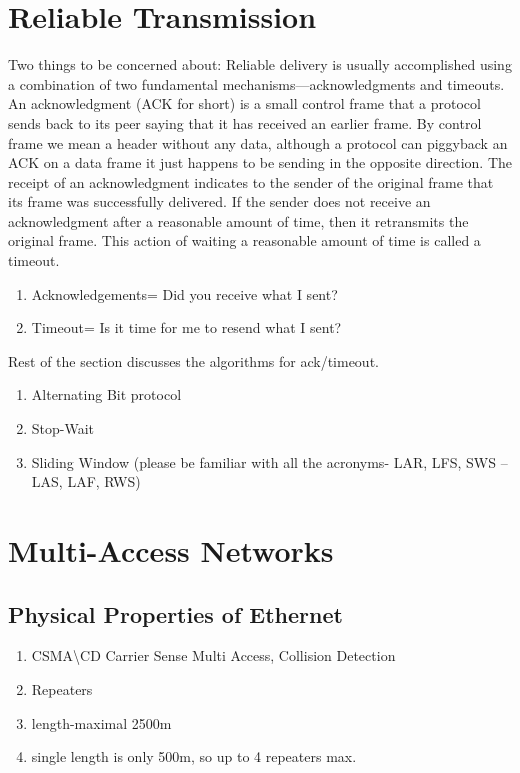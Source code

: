 \documentclass[12pt]{book}
\begin{document}
\section{Reliable Transmission}
Two things to be concerned about:
Reliable delivery is usually accomplished using a combination of two fundamental mechanisms—acknowledgments and timeouts. An acknowledgment (ACK for short) is a small control frame that a protocol sends back to its peer saying that it has received an earlier frame. By control frame we mean a header without any data, although a protocol can piggyback an ACK on a data frame it just happens to be sending in the opposite direction. The receipt of an acknowledgment indicates to the sender of the original frame that its frame was successfully delivered. If the sender does not receive an acknowledgment after a reasonable amount of time, then it retransmits the original frame. This action of waiting a reasonable amount of time is called a timeout.
\begin{enumerate}
    \item Acknowledgements= Did you receive what I sent?
    \item Timeout= Is it time for me to resend what I sent?
\end{enumerate}
Rest of the section discusses the algorithms for ack/timeout.

\begin{enumerate}
    \item Alternating Bit protocol
    \item Stop-Wait
    \item Sliding Window (please be familiar with all the acronyms- LAR, LFS, SWS -- LAS, LAF, RWS)
\end{enumerate}

\section{Multi-Access Networks}
\subsection{Physical Properties of Ethernet}
\begin{enumerate}
    \item CSMA\textbackslash CD Carrier Sense Multi Access, Collision Detection
    \item Repeaters
    \item length-maximal 2500m
    \item single length is only 500m, so up to 4 repeaters max.
\end{enumerate}
\end{document}
